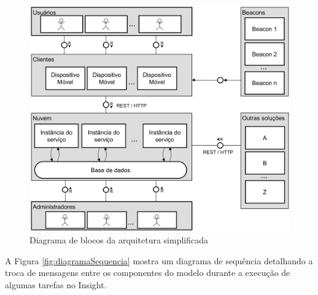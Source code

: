 \documentclass[english,brazilian]{UNISINOSmonografia}
\begin{document}
\begin{figure}[!ht]
	\caption{Diagrama de blocos da arquitetura simplificada}
	\label{fig:arquitetura}
	\centering%
	\begin{minipage}{.8\textwidth}
		\includegraphics[width=\textwidth]{imgs/arquitetura.png}
	\end{minipage}
\end{figure}


A Figura \ref{fig:diagramaSequencia} mostra um diagrama de sequência detalhando a troca de mensagens entre os componentes do modelo durante a execução de algumas tarefas no Insight.
\end{document}
